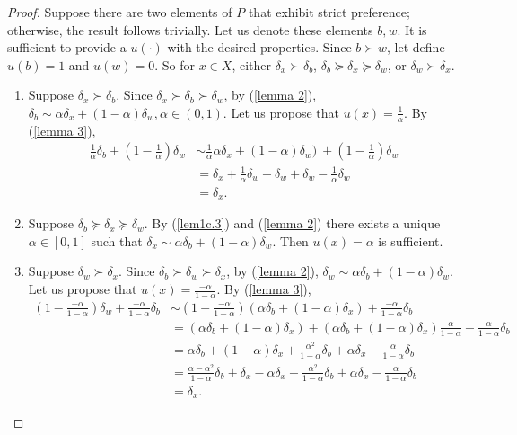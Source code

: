 \documentclass[12pt]{article}
\theoremstyle{definition}
\theoremstyle{remark}
\begin{document}
\begin{proof}
  Suppose there are two elements of $P$ that exhibit strict preference; otherwise, the result follows trivially. Let us denote these elements $b, w$. It is sufficient to provide a $u(\cdot)$ with the desired properties. Since $b \succ w$, let define $u(b) = 1$ and $u(w) = 0$. So for $x \in X$, either $\delta_x \succ \delta_b$, $\delta_b \succeq \delta_x \succeq \delta_w$, or $\delta_w \succ \delta_x$.
  \begin{enumerate}
    \item Suppose $\delta_x \succ \delta_b$. Since $\delta_x \succ \delta_b \succ \delta_w$, by (\ref{lemma 2}), $\delta_b \sim \alpha \delta_x + (1 - \alpha)\delta_w, \alpha \in (0,1)$. Let us propose that $u(x) = \frac{1}{\alpha}$. By (\ref{lemma 3}),
    \begin{align*}
      \frac{1}{\alpha}\delta_b + \left(1 - \frac{1}{\alpha}\right)\delta_w &\sim \frac{1}{\alpha}\alpha \delta_x + (1 - \alpha)\delta_w)\ + \left(1 - \frac{1}{\alpha}\right)\delta_w \\
      &= \delta_x + \frac{1}{\alpha}\delta_w - \delta_w + \delta_w - \frac{1}{\alpha}\delta_w \\
      &= \delta_x.
    \end{align*}
    \item Suppose $\delta_b \succeq \delta_x \succeq \delta_w$. By (\ref{lem1c.3}) and (\ref{lemma 2}) there exists a unique $\alpha \in [0,1]$ such that $\delta_x \sim \alpha \delta_b + (1 - \alpha)\delta_w$. Then $u(x) = \alpha$ is sufficient.
    \item Suppose $\delta_w \succ \delta_x$. Since $\delta_b \succ \delta_w \succ \delta_x$, by (\ref{lemma 2}), $\delta_w \sim \alpha \delta_b + (1 - \alpha)\delta_w$. Let us propose that $u(x) = \frac{-\alpha}{1 - \alpha}$. By (\ref{lemma 3}),
    \begin{align*}
      \left( 1 - \frac{-\alpha}{1 - \alpha}\right) \delta_w + \frac{-\alpha}{1 - \alpha}\delta_b &\sim \left( 1 - \frac{-\alpha}{1 - \alpha}\right) (\alpha \delta_b + (1 - \alpha)\delta_x) + \frac{-\alpha}{1 - \alpha}\delta_b \\
      &= (\alpha \delta_b + (1 - \alpha)\delta_x) + (\alpha \delta_b + (1 - \alpha)\delta_x)\frac{\alpha}{1 - \alpha} - \frac{\alpha}{1 - \alpha}\delta_b \\
      &= \alpha \delta_b + (1 - \alpha)\delta_x + \frac{\alpha^2}{1 - \alpha}\delta_b + \alpha\delta_x - \frac{\alpha}{1 - \alpha}\delta_b \\
      &= \frac{\alpha - \alpha^2}{1 - \alpha} \delta_b + \delta_x - \alpha\delta_x + \frac{\alpha^2}{1 - \alpha}\delta_b + \alpha\delta_x - \frac{\alpha}{1 - \alpha}\delta_b \\
      &= \delta_x.
    \end{align*}
  \end{enumerate}
\end{proof}
\end{document}
